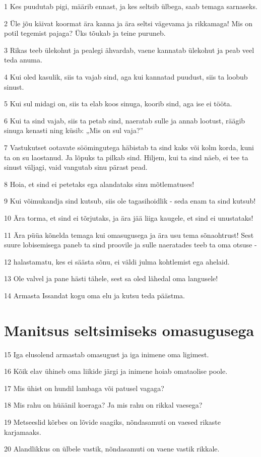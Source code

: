 \par 1 Kes puudutab pigi, määrib ennast, ja kes seltsib ülbega, saab temaga sarnaseks.
\par 2 Üle jõu käivat koormat ära kanna ja ära seltsi vägevama ja rikkamaga! Mis on potil tegemist pajaga? Üks tõukab ja teine puruneb.
\par 3 Rikas teeb ülekohut ja pealegi ähvardab, vaene kannatab ülekohut ja peab veel teda anuma.
\par 4 Kui oled kasulik, siis ta vajab sind, aga kui kannatad puudust, siis ta loobub sinust.
\par 5 Kui sul midagi on, siis ta elab koos sinuga, koorib sind, aga ise ei tööta.
\par 6 Kui ta sind vajab, siis ta petab sind, naeratab sulle ja annab lootust, räägib sinuga kenasti ning küsib: „Mis on sul vaja?”
\par 7 Vastukutset ootavate söömingutega häbistab ta sind kaks või kolm korda, kuni ta on su laostanud. Ja lõpuks ta pilkab sind. Hiljem, kui ta sind näeb, ei tee ta sinust väljagi, vaid vangutab sinu pärast pead.
\par 8 Hoia, et sind ei petetaks ega alandataks sinu mõtlematuses!
\par 9 Kui võimukandja sind kutsub, siis ole tagasihoidlik - seda enam ta sind kutsub!
\par 10 Ära torma, et sind ei tõrjutaks, ja ära jää liiga kaugele, et sind ei unustataks!
\par 11 Ära püüa kõnelda temaga kui omasugusega ja ära usu tema sõnaohtrust! Sest suure lobisemisega paneb ta sind proovile ja sulle naeratades teeb ta oma otsuse -
\par 12 halastamatu, kes ei säästa sõnu, ei väldi julma kohtlemist ega ahelaid.
\par 13 Ole valvel ja pane hästi tähele, sest sa oled lähedal oma langusele!
\par 14 Armasta Issandat kogu oma elu ja kutsu teda päästma.

\section*{Manitsus seltsimiseks omasugusega}

\par 15 Iga elusolend armastab omasugust ja iga inimene oma ligimest.
\par 16 Kõik elav ühineb oma liikide järgi ja inimene hoiab omataolise poole.
\par 17 Mis ühist on hundil lambaga või patusel vagaga?
\par 18 Mis rahu on hüäänil koeraga? Ja mis rahu on rikkal vaesega?
\par 19 Metseeslid kõrbes on lõvide saagiks, nõndasamuti on vaesed rikaste karjamaaks.
\par 20 Alandlikkus on ülbele vastik, nõndasamuti on vaene vastik rikkale.


